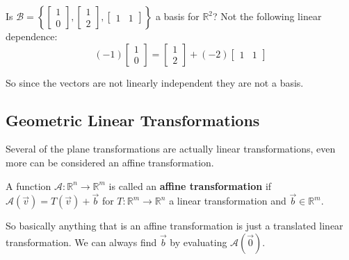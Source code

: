 \begin{example}
Is $\mathcal{B}=\left\{\begin{bmatrix}1 \\ 0 \end{bmatrix}, \begin{bmatrix}1 \\ 2  \end{bmatrix}, \begin{bmatrix}1 & 1 \end{bmatrix}\right\}$ a basis for $\mathbb{R}^2$?
Not the following linear dependence:
\[
(-1)\begin{bmatrix}1 \\ 0 \end{bmatrix}= \begin{bmatrix}1 \\ 2  \end{bmatrix}+(-2)\begin{bmatrix}1 & 1 \end{bmatrix}
\]

So since the vectors are not linearly independent they are not a basis.
\end{example}



\subsection{Geometric Linear Transformations}
Several of the plane transformations are actually linear transformations, even more can be considered an affine transformation.

\begin{definition}
A function $\mathcal{A}:\mathbb{R}^n \to \mathbb{R}^m$ is called an \textbf{affine transformation} if 
$\mathcal{A}(\vec{v})=T(\vec{v})+\vec{b}$ for $T:\mathbb{R}^m \to \mathbb{R}^n$ a linear transformation and $\vec{b} \in \mathbb{R}^m$. 
\end{definition}

\begin{remark}
So basically anything that is an affine transformation is just a translated linear transformation. We can always find $\vec{b}$ by evaluating $\mathcal{A}(\vec{0})$.
\end{remark}

